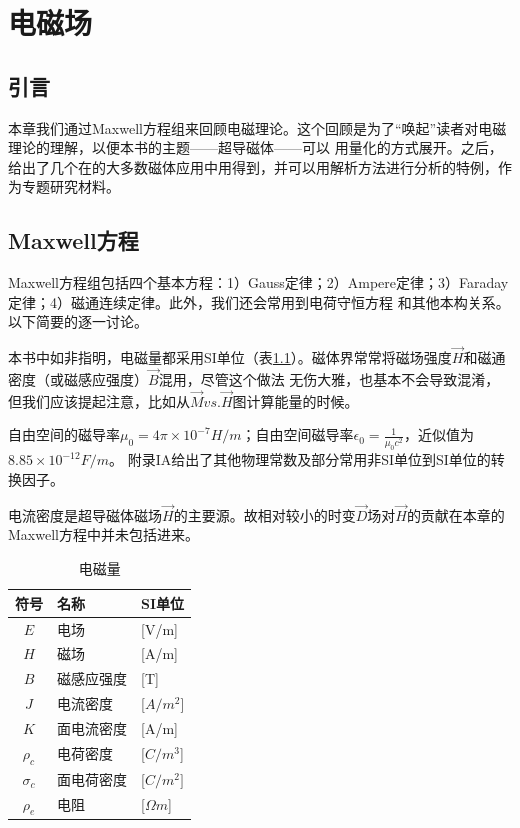 \chapter{电磁场}
\section{引言}
本章我们通过Maxwell方程组来回顾电磁理论。这个回顾是为了“唤起”读者对电磁理论的理解，以便本书的主题——超导磁体——可以
用量化的方式展开。之后，给出了几个在的大多数磁体应用中用得到，并可以用解析方法进行分析的特例，作为专题研究材料。
\section{Maxwell方程}
Maxwell方程组包括四个基本方程：1）Gauss定律；2）Ampere定律；3）Faraday定律；4）磁通连续定律。此外，我们还会常用到电荷守恒方程
和其他本构关系。以下简要的逐一讨论。

本书中如非指明，电磁量都采用SI单位（表\ref{emquantity}）。磁体界常常将磁场强度$\vec{H}$和磁通密度（或磁感应强度）$\vec{B}$混用，尽管这个做法
无伤大雅，也基本不会导致混淆，但我们应该提起注意，比如从$\vec{M} vs. \vec{H}$图计算能量的时候。

自由空间的磁导率$\mu_0=4\pi \times 10^{-7} H/m$；自由空间磁导率$\epsilon_0=\frac{1}{\mu_0c^2}$，近似值为$8.85\times 10^{-12} F/m$。
附录IA给出了其他物理常数及部分常用非SI单位到SI单位的转换因子。

电流密度是超导磁体磁场$\vec{H}$的主要源。故相对较小的时变$\vec{D}$场对$\vec{H}$的贡献在本章的Maxwell方程中并未包括进来。

\begin{table}[htbp]\small
  \centering
  \caption{电磁量} \label{emquantity}
\begin{tabular}{|c||l|l|}
  \hline
  符号 & 名称 & SI单位 \\ \hline \hline
  $E$&电场&[V/m] \\ \hline
  $H$&磁场&[A/m] \\ \hline
  $B$&磁感应强度&[T]\\ \hline
  $J$&电流密度&[$A/m^2$] \\ \hline
  $K$&面电流密度&[A/m]\\ \hline
  $\rho_c$&电荷密度&[$C/m^3$]\\ \hline
  $\sigma_c$&面电荷密度&[$C/m^2]$\\ \hline
  $\rho_e$&电阻&[$\Omega m$]\\
  \hline
\end{tabular}
\end{table}

